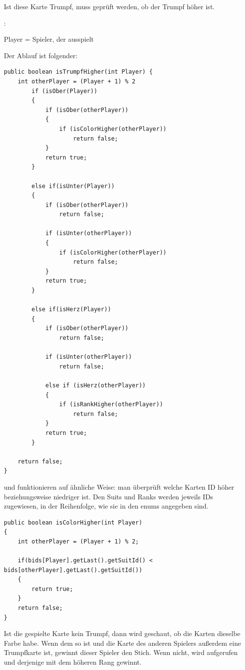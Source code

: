 Ist diese Karte Trumpf, muss geprüft werden, ob der Trumpf höher ist.

: 

Player = Spieler, der ausspielt

Der Ablauf ist folgender:
\begin{lstlisting}[caption={isTrumpfHigher Methode},captionpos=b]
public boolean isTrumpfHigher(int Player) {
    int otherPlayer = (Player + 1) % 2
        if (isOber(Player))
        {
            if (isOber(otherPlayer))
            {
                if (isColorHigher(otherPlayer))
                    return false;
            }
            return true;
        }

        else if(isUnter(Player))
        {
            if (isOber(otherPlayer))
                return false;

            if (isUnter(otherPlayer))
            {
                if (isColorHigher(otherPlayer))
                    return false;
            }
            return true;
        }

        else if(isHerz(Player))
        {
            if (isOber(otherPlayer))
                return false;

            if (isUnter(otherPlayer))
                return false;

            else if (isHerz(otherPlayer))
            {
                if (isRankHigher(otherPlayer))
                    return false;
            }
            return true;
        }

    return false;
}
\end{lstlisting}
 
 und  funktionieren auf ähnliche
Weise: man überprüft welche Karten ID höher beziehungsweise niedriger ist. Den
Suits und Ranks werden jeweils IDs zugewiesen, in der Reihenfolge, wie sie in
den enums angegeben sind.

\begin{lstlisting}[caption={IDs am Beispiel von isColorHigher},captionpos=b]
public boolean isColorHigher(int Player)
{
    int otherPlayer = (Player + 1) % 2;

    if(bids[Player].getLast().getSuitId() < bids[otherPlayer].getLast().getSuitId())
    {
        return true;
    }
    return false;
}
\end{lstlisting}

Ist die gespielte Karte kein Trumpf, dann wird geschaut, ob die Karten dieselbe
Farbe habe. Wenn dem so ist und die Karte des anderen Spielers außerdem eine
Trumpfkarte ist, gewinnt dieser Spieler den Stich. Wenn nicht, wird
 aufgerufen und derjenige mit dem höheren Rang gewinnt.


